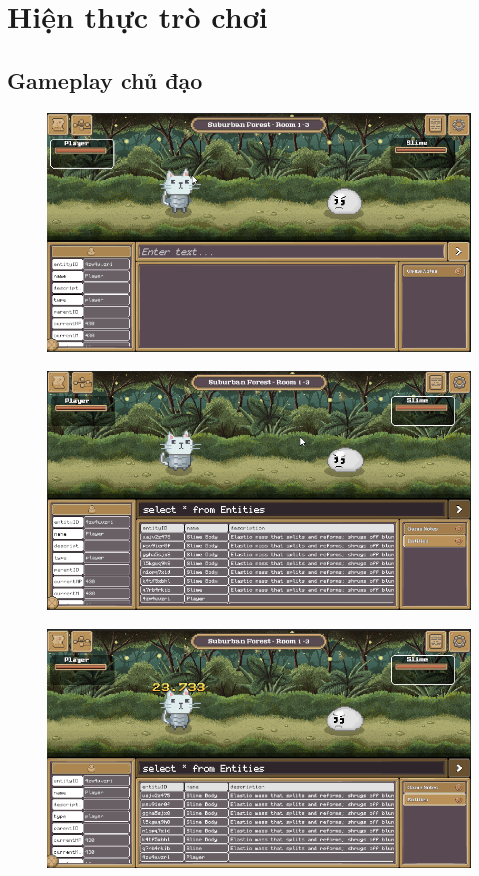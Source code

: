 \section{Hiện thực trò chơi}
\subsection{Gameplay chủ đạo}

\begin{figure}[H]
	\centering
	\includegraphics[width=13cm]{Images/gameplay1.png}
	\vspace{0.5cm}
	\caption{}
\end{figure}

\begin{figure}[H]
	\centering
	\includegraphics[width=13cm]{Images/gameplay2.png}
	\vspace{0.5cm}
	\caption{}
\end{figure}

\begin{figure}[H]
	\centering
	\includegraphics[width=13cm]{Images/gameplay3.png}
	\vspace{0.5cm}
	\caption{}
\end{figure}

